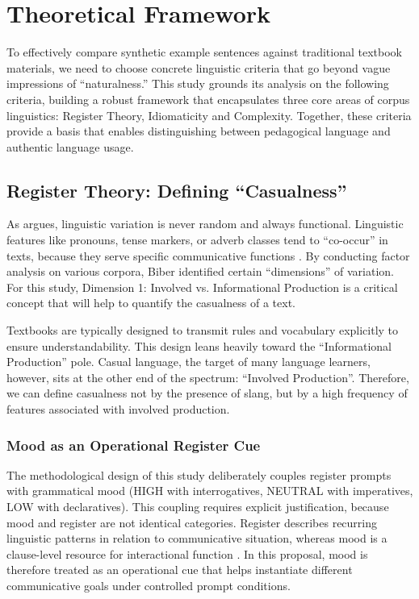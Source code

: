 \section{Theoretical Framework}
To effectively compare synthetic example sentences against traditional textbook materials, we need to choose concrete linguistic criteria that go beyond vague impressions of ``naturalness.'' This study grounds its analysis on the following criteria, building a robust framework that encapsulates three core areas of corpus linguistics: Register Theory, Idiomaticity and Complexity. Together, these criteria provide a basis that enables distinguishing between pedagogical language and authentic language usage.

\subsection{Register Theory: Defining ``Casualness''}
As \textcite{biber1988variation} argues, linguistic variation is never random and always functional. Linguistic features like pronouns, tense markers, or adverb classes tend to ``co-occur'' in texts, because they serve specific communicative functions \parencite[13]{biber1988variation}. By conducting factor analysis on various corpora, Biber identified certain ``dimensions'' of variation. For this study, Dimension 1: Involved vs. Informational Production \parencite[107]{biber1988variation} is a critical concept that will help to quantify the casualness of a text.

Textbooks are typically designed to transmit rules and vocabulary explicitly to ensure understandability. This design leans heavily toward the ``Informational Production'' pole. Casual language, the target of many language learners, however, sits at the other end of the spectrum: ``Involved Production''. Therefore, we can define casualness not by the presence of slang, but by a high frequency of features associated with involved production.

\subsubsection{Mood as an Operational Register Cue}

The methodological design of this study deliberately couples register prompts with grammatical mood (HIGH with interrogatives, NEUTRAL with imperatives, LOW with declaratives). This coupling requires explicit justification, because mood and register are not identical categories. Register describes recurring linguistic patterns in relation to communicative situation, whereas mood is a clause-level resource for interactional function \parencite{biber1988variation,biber1999longman,hallidayMatthiessenIntroductionFunctional2014}. In this proposal, mood is therefore treated as an operational cue that helps instantiate different communicative goals under controlled prompt conditions.

